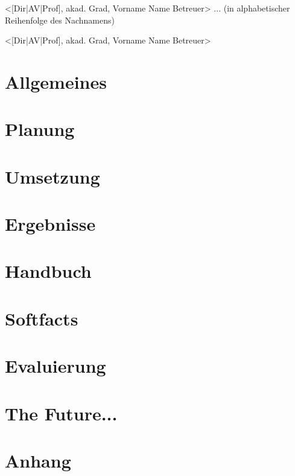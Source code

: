 \documentclass[12pt,a4paper,english,twoside,openright,DIV=12,BCOR=1cm]{scrbook}
\begin{document}
<{[}Dir|AV|Prof{]}, akad. Grad, Vorname Name Betreuer> ... (in alphabetischer
Reihenfolge des Nachnamens)

<{[}Dir|AV|Prof{]}, akad. Grad, Vorname Name Betreuer>

\vspace{10mm}

\renewcommand*{\chapterpagestyle}{fancy}
\cleardoublepage{}
\tableofcontents{}
\cleardoublepage{}
\listoftables
\cleardoublepage{}
\listoffigures

\cleardoublepage{}

\pagestyle{fancy}
\thispagestyle{fancy}

\chapter{Allgemeines}
\renewcommand{\kapitelautor}{Susi Sorglos}


\chapter{Planung}

\chapter{Umsetzung}

\chapter{Ergebnisse}

\chapter{Handbuch}

\chapter{Softfacts}

\chapter{Evaluierung}

\chapter{The Future...}
\renewcommand{\kapitelautor}{Erik Ritschl}


\appendix

\chapter{Anhang}

\printindex{}



\end{document}
